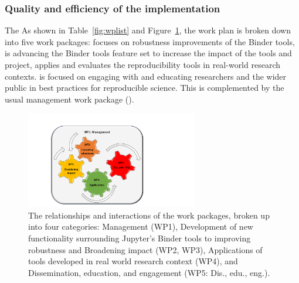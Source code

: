 

\subsubsection{Quality and efficiency of the implementation}\label{sec:workplan-structure}

\ifgrantagreement The \else As shown in Table~\ref{fig:wplist} and
Figure~\ref{fig:workpackages}, the \fi work plan is broken down into five work
packages:  focuses on robustness improvements of the
Binder tools,  is advancing the Binder tools feature set to
increase the impact of the tools and project,  applies and
evaluates the reproducibility tools in real-world research contexts.
 is focused on engaging with and educating researchers and the
wider public in best practices for reproducible science. This is complemented by
the usual management work package ().

\begin{figure}[htb]
  \centering
  \includegraphics[width=0.67\textwidth]{images/WP.pdf}
  \caption{
    \label{fig:workpackages}
    The relationships and interactions of the work packages,
    broken up into four categories: Management (WP1),
    Development of new functionality surrounding Jupyter's Binder tools to improving robustness 
    and Broadening impact (WP2, WP3),
    Applications of tools developed in real world research context (WP4),
    and Dissemination, education, and engagement (WP5: Dis., edu., eng.).
  }
\end{figure}


